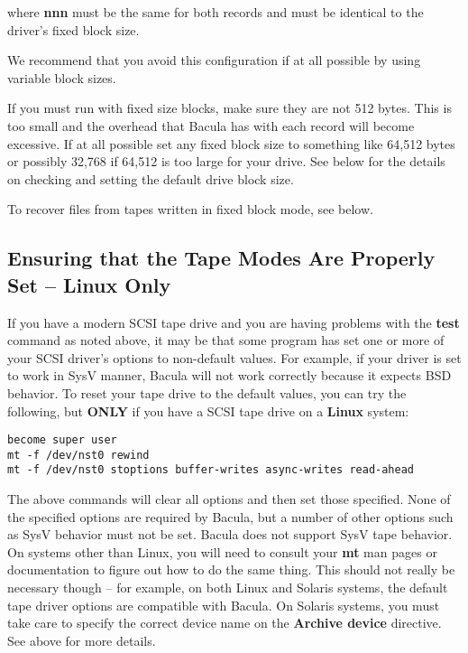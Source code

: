 where {\bf nnn} must be the same for both records and must be identical to the
driver's fixed block size. 

We recommend that you avoid this configuration if at all possible by using
variable block sizes. 

If you must run with fixed size blocks, make sure they are not 512 bytes. This
is too small and the overhead that Bacula has with each record will become
excessive. If at all possible set any fixed block size to something like
64,512 bytes or possibly 32,768 if 64,512 is too large for your drive. See
below for the details on checking and setting the default drive block size. 

To recover files from tapes written in fixed block mode, see below. 

\label{TapeModes}
\subsection{Ensuring that the Tape Modes Are Properly Set -- {\bf Linux
Only}}

If you have a modern SCSI tape drive and you are having problems with the {\bf
test} command as noted above, it may be that some program has set one or more
of your SCSI driver's options to non-default values. For example, if your
driver is set to work in SysV manner, Bacula will not work correctly because
it expects BSD behavior. To reset your tape drive to the default values, you
can try the following, but {\bf ONLY} if you have a SCSI tape drive on a {\bf
Linux} system: 

\footnotesize
\begin{verbatim}
become super user
mt -f /dev/nst0 rewind
mt -f /dev/nst0 stoptions buffer-writes async-writes read-ahead
\end{verbatim}
\normalsize

The above commands will clear all options and then set those specified. None
of the specified options are required by Bacula, but a number of other options
such as SysV behavior must not be set. Bacula does not support SysV tape
behavior. On systems other than Linux, you will need to consult your {\bf mt}
man pages or documentation to figure out how to do the same thing. This should
not really be necessary though -- for example, on both Linux and Solaris
systems, the default tape driver options are compatible with Bacula. 
On Solaris systems, you must take care to specify the correct device
name on the {\bf Archive device} directive. See above for more details.


